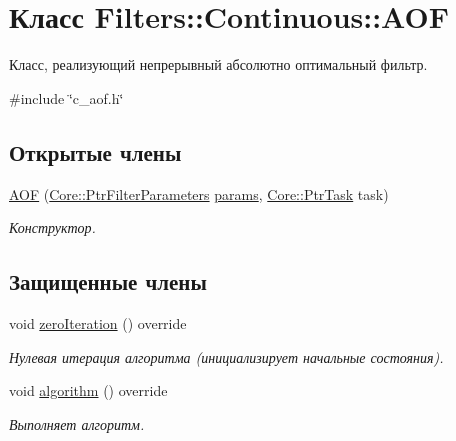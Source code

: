 \hypertarget{class_filters_1_1_continuous_1_1_a_o_f}{}\section{Класс Filters\+:\+:Continuous\+:\+:A\+OF}
\label{class_filters_1_1_continuous_1_1_a_o_f}


Класс, реализующий непрерывный абсолютно оптимальный фильтр.  




{\ttfamily \#include \char`\"{}c\+\_\+aof.\+h\char`\"{}}

\subsection*{Открытые члены}
\begin{DoxyCompactItemize}
\item 
\hypertarget{class_filters_1_1_continuous_1_1_a_o_f_a92b07f56c7e0254c635404f0d1d04fa3}{}\label{class_filters_1_1_continuous_1_1_a_o_f_a92b07f56c7e0254c635404f0d1d04fa3} 
\hyperlink{class_filters_1_1_continuous_1_1_a_o_f_a92b07f56c7e0254c635404f0d1d04fa3}{A\+OF} (\hyperlink{namespace_core_a4811af8148ba137d644b9a61a042cf03}{Core\+::\+Ptr\+Filter\+Parameters} \hyperlink{class_core_1_1_filter_a44aa749b49ba46256975ce545531ecf7}{params}, \hyperlink{namespace_core_abfda8f69fcacfcea2696549b548ed737}{Core\+::\+Ptr\+Task} task)
\begin{DoxyCompactList}\small\item\em Конструктор. \end{DoxyCompactList}\end{DoxyCompactItemize}
\subsection*{Защищенные члены}
\begin{DoxyCompactItemize}
\item 
void \hyperlink{class_filters_1_1_continuous_1_1_a_o_f_ab416b56dbeb26366f495f03b3c08ad5e}{zero\+Iteration} () override
\begin{DoxyCompactList}\small\item\em Нулевая итерация алгоритма (инициализирует начальные состояния). \end{DoxyCompactList}\item 
void \hyperlink{class_filters_1_1_continuous_1_1_a_o_f_af25cf723db57bba9d52173b27f960170}{algorithm} () override
\begin{DoxyCompactList}\small\item\em Выполняет алгоритм. \end{DoxyCompactList}\end{DoxyCompactItemize}
